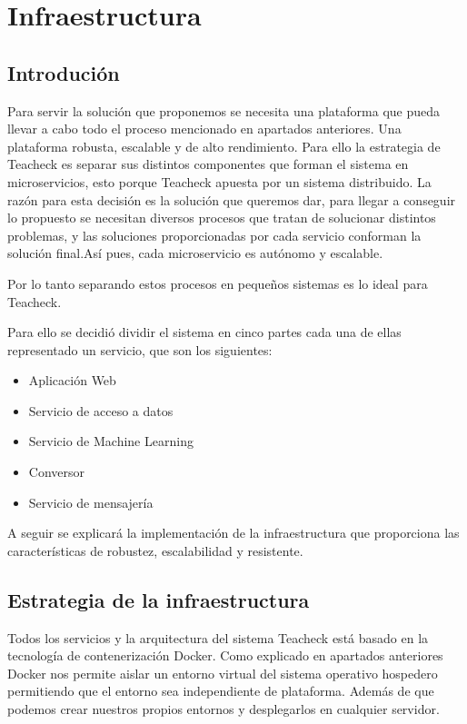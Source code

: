 \chapter{Infraestructura}

\section{Introdución}
Para servir la solución que proponemos se necesita una plataforma que pueda llevar a cabo todo el proceso mencionado en apartados anteriores. Una plataforma robusta, escalable y de alto rendimiento. Para ello la estrategia de Teacheck es separar sus distintos componentes que forman el sistema en microservicios, esto porque Teacheck apuesta por un sistema distribuido. La razón para esta decisión es la solución que queremos dar, para llegar a conseguir lo propuesto se necesitan diversos procesos que tratan de solucionar distintos problemas, y las soluciones proporcionadas por cada servicio conforman la solución final.Así pues, cada microservicio es autónomo y escalable.

Por lo tanto separando estos procesos en pequeños sistemas es lo ideal para Teacheck. 

Para ello se decidió dividir el sistema en cinco partes cada una de ellas representado un servicio, que son los siguientes:
\begin{itemize}
\item{Aplicación Web}
\item{Servicio de acceso a datos}
\item{Servicio de Machine Learning}
\item{Conversor}
\item{Servicio de mensajería}
\end{itemize}

A seguir se explicará la implementación de la infraestructura que proporciona las características de robustez, escalabilidad y resistente.
\section{Estrategia de la infraestructura}

Todos los servicios y la arquitectura del sistema Teacheck está basado en la tecnología de contenerización Docker. Como explicado en apartados anteriores Docker nos permite aislar un entorno virtual del sistema operativo hospedero permitiendo que el entorno sea independiente de plataforma. Además de que podemos crear nuestros propios entornos y desplegarlos en cualquier servidor. 

